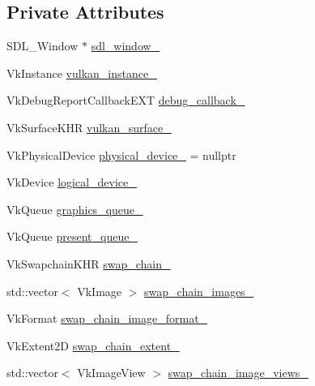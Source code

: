 \subsection*{Private Attributes}
\begin{DoxyCompactItemize}
\item 
S\+D\+L\+\_\+\+Window $\ast$ \mbox{\hyperlink{classvulkan__application_a54a50845f409d0973e2f52f65a9cec1d}{sdl\+\_\+window\+\_\+}}
\item 
Vk\+Instance \mbox{\hyperlink{classvulkan__application_adaadd43d3b44441517543a3dab918cbb}{vulkan\+\_\+instance\+\_\+}}
\item 
Vk\+Debug\+Report\+Callback\+E\+XT \mbox{\hyperlink{classvulkan__application_a1906465a4a664a8be6d6df38340eeafc}{debug\+\_\+callback\+\_\+}}
\item 
Vk\+Surface\+K\+HR \mbox{\hyperlink{classvulkan__application_a2492ee7a49aab081e5ab348981bece0e}{vulkan\+\_\+surface\+\_\+}}
\item 
Vk\+Physical\+Device \mbox{\hyperlink{classvulkan__application_ae3478ed1667c4e9e3728d5c0b90cc18b}{physical\+\_\+device\+\_\+}} = nullptr
\item 
Vk\+Device \mbox{\hyperlink{classvulkan__application_a1f890b4eb7b99da38b17c7fa938846d7}{logical\+\_\+device\+\_\+}}
\item 
Vk\+Queue \mbox{\hyperlink{classvulkan__application_a6d9dfc3ea9dd3ab636a8732a531dd50e}{graphics\+\_\+queue\+\_\+}}
\item 
Vk\+Queue \mbox{\hyperlink{classvulkan__application_a0ea345da04dec8dfa152119f18a9d83f}{present\+\_\+queue\+\_\+}}
\item 
Vk\+Swapchain\+K\+HR \mbox{\hyperlink{classvulkan__application_a371a0f23b472dd5b864ab7f6216a62f9}{swap\+\_\+chain\+\_\+}}
\item 
std\+::vector$<$ Vk\+Image $>$ \mbox{\hyperlink{classvulkan__application_a807f02a6ea2ac40920ade18d8bb7f014}{swap\+\_\+chain\+\_\+images\+\_\+}}
\item 
Vk\+Format \mbox{\hyperlink{classvulkan__application_a3d95f5900aecca3ee3a3d1b4ae217090}{swap\+\_\+chain\+\_\+image\+\_\+format\+\_\+}}
\item 
Vk\+Extent2D \mbox{\hyperlink{classvulkan__application_a2546d682f51a41d69810f1a6f1668aa6}{swap\+\_\+chain\+\_\+extent\+\_\+}}
\item 
std\+::vector$<$ Vk\+Image\+View $>$ \mbox{\hyperlink{classvulkan__application_ab2055e66f040916c7629ca379b159f95}{swap\+\_\+chain\+\_\+image\+\_\+views\+\_\+}}
\item 

\end{DoxyCompactItemize}

